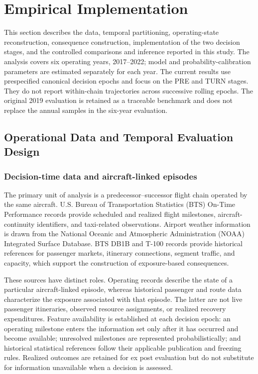 \section{Empirical Implementation}
\label{sec:implementation}

This section describes the data, temporal partitioning, operating-state reconstruction, consequence construction, implementation of the two decision stages, and the controlled comparisons and inference reported in this study. The analysis covers six operating years, 2017--2022; model and probability-calibration parameters are estimated separately for each year. The current results use prespecified canonical decision epochs and focus on the PRE and TURN stages. They do not report within-chain trajectories across successive rolling epochs. The original 2019 evaluation is retained as a traceable benchmark and does not replace the annual samples in the six-year evaluation.

\subsection{Operational Data and Temporal Evaluation Design}
\label{subsec:data_design}

\subsubsection{Decision-time data and aircraft-linked episodes}

The primary unit of analysis is a predecessor--successor flight chain operated by the same aircraft. U.S. Bureau of Transportation Statistics (BTS) On-Time Performance records provide scheduled and realized flight milestones, aircraft-continuity identifiers, and taxi-related observations. Airport weather information is drawn from the National Oceanic and Atmospheric Administration (NOAA) Integrated Surface Database. BTS DB1B and T-100 records provide historical references for passenger markets, itinerary connections, segment traffic, and capacity, which support the construction of exposure-based consequences.

These sources have distinct roles. Operating records describe the state of a particular aircraft-linked episode, whereas historical passenger and route data characterize the exposure associated with that episode. The latter are not live passenger itineraries, observed resource assignments, or realized recovery expenditures. Feature availability is established at each decision epoch: an operating milestone enters the information set only after it has occurred and become available; unresolved milestones are represented probabilistically; and historical statistical references follow their applicable publication and freezing rules. Realized outcomes are retained for ex post evaluation but do not substitute for information unavailable when a decision is assessed.

